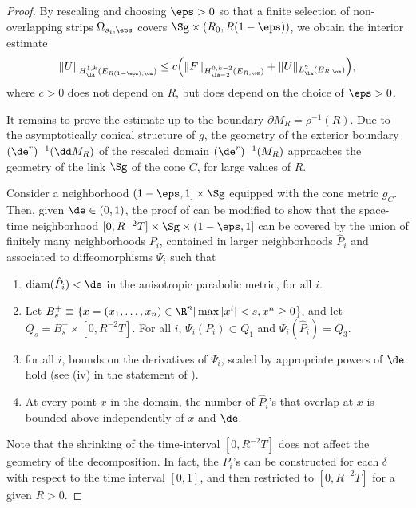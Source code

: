 \documentclass[hidelinks, 12pt, oneside, reqno]{amsart}
\begin{document}
\begin{proof}
    By rescaling and choosing $\eps > 0$ so that a finite selection of non-overlapping strips $\Omega_{s_i,\eps}$ covers $\Sg \times (R_0, R(1-\eps))$, we obtain the interior estimate
    \[
    \|U\|_{H^{1,k}_{\la}(E_{R(1-\eps),\om})} \le c\Big(\|F\|_{H^{0,k-2}_{\la-2}(E_{R,\om})} + \|U\|_{L^2_{\la}(E_{R,\om})} \Big),
    \]
    where $c > 0$ does not depend on $R$, but does depend on the choice of $\eps > 0$.

    It remains to prove the estimate up to the boundary $\partial M_R = \rho^{-1}(R)$. Due to the asymptotically conical structure of $g$, the geometry of the exterior boundary $(\de^{r})^{-1}(\dd M_R)$ of the rescaled domain $(\de^{r})^{-1}(M_R)$ approaches the geometry of the link $\Sg$ of the cone $C$, for large values of $R$. 

    Consider a neighborhood $(1-\eps,1] \times \Sg$ equipped with the cone metric $g_C$. Then, given $\de \in (0,1)$, the proof of \cite[Lemma 4]{SchlagSchauder} can be modified to show that the space-time neighborhood $[0,R^{-2}T] \times \Sg \times (1-\eps,1]$ can be covered by the union of finitely many neighborhoods $P_i$, contained in larger neighborhoods $\hat P_i$ and associated to diffeomorphisms $\Psi_i$ such that
    \begin{enumerate}
        \item $\mathrm{diam}(\hat P_i) < \de$ in the anisotropic parabolic metric, for all $i$.
        \item Let $B_s^{+} \equiv \{x = (x_1, \ldots, x_n) \in \R^n| \max |x^i| < s, x^n  \ge 0$\}, and let $Q_s = B_s^{+} \times [0,R^{-2}T]$. For all $i$, $\Psi_i(P_i) \subset Q_1$ and $\Psi_i(\hat P_i) = Q_3$. 
        \item for all $i$, bounds on the derivatives of $\Psi_i$, scaled by appropriate powers of $\de$ hold (see (iv) in the statement of \cite[Lemma 4]{SchlagSchauder}).
        \item At every point $x$ in the domain, the number of $\hat P_i$'s that overlap at $x$ is bounded above independently of $x$ and $\de$.
    \end{enumerate}
    Note that the shrinking of the time-interval $[0,R^{-2}T]$ does not affect the geometry of the decomposition. In fact, the $P_i$'s can be constructed for each $\delta$ with respect to the time interval $[0,1]$, and then restricted to $[0,R^{-2}T]$ for a given $R>0$.


\end{proof}
\end{document}
